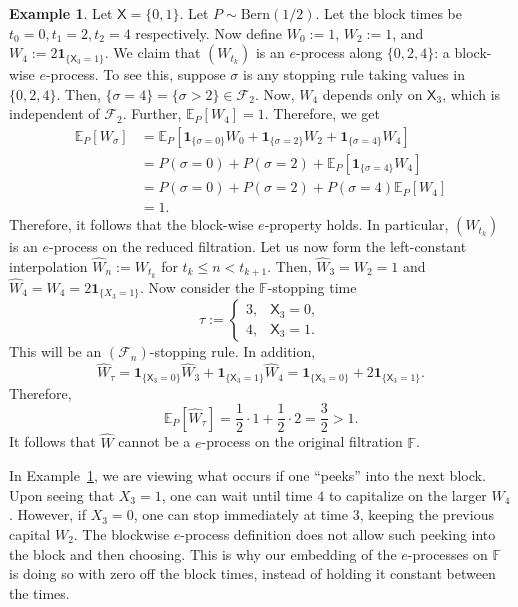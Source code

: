 \documentclass[11pt]{article}
\newcommand{\E}{\mathbb{E}}
\newcommand{\X}{\mathsf{X}}
\newcommand{\bbF}{\mathbb F}
\theoremstyle{definition}
\newtheorem{example}[theorem]{Example}
\theoremstyle{definition}
\begin{document}
\begin{example}\label{ex:counterzero-versus-constant-eproc}
Let $\X=\{0,1\}$. Let $P\sim\mathrm{Bern}(1/2)$. Let the block times be $t_0=0, t_1=2, t_2=4$ respectively. Now define $W_0:=1$, $W_2:=1$, and $W_4:=2\mathbf{1}_{\{\X_{3}=1\}}$. We claim that $(W_{t_k})$ is an $e$-process along $\{0,2,4\}$: a block-wise $e$-process. To see this, suppose $\sigma$ is any stopping rule taking values in $\{0,2,4\}$. Then, $\{\sigma=4\}=\{\sigma>2\}\in\mathcal F_2$. Now, $W_4$ depends only on $\X_3$, which is independent of $\mathcal F_2$. Further, $\E_P[W_4]=1$. Therefore, we get
\begin{align*}
\E_P[W_{\sigma}]&=\E_P[\mathbf{1}_{\{\sigma=0\}}W_0+\mathbf{1}_{\{\sigma=2\}}W_2+\mathbf{1}_{\{\sigma=4\}}W_4]\\
&= P(\sigma=0) + P(\sigma=2) + \E_P[\mathbf{1}_{\{\sigma=4\}}W_4]\\
&= P(\sigma=0)+P(\sigma=2)+P(\sigma=4)\E_P[W_4]\\
&= 1.
\end{align*}
Therefore, it follows that the block-wise $e$-property holds. In particular, $(W_{t_k})$ is an $e$-process on the reduced filtration. Let us now form the left-constant interpolation $\widehat W_n:=W_{t_k}$ for $t_k\le n<t_{k+1}$. Then, $\widehat W_3=W_2=1$ and $\widehat W_4=W_4=2\mathbf{1}_{\{X_3=1\}}$. Now consider the $\bbF$-stopping time
\[
\tau:=
\begin{cases}
3,&\X_3=0,\\
4,&\X_3=1.
\end{cases}
\]
This will be an $(\mathcal F_n)$-stopping rule. In addition,
\[
\widehat W_{\tau}=\mathbf{1}_{\{\X_3=0\}}\widehat W_3 + \mathbf{1}_{\{\X_3=1\}}\widehat W_4 = \mathbf{1}_{\{\X_3=0\}} + 2\mathbf{1}_{\{\X_3=1\}}.
\]
Therefore,
\[
\E_P[\widehat W_{\tau}]=\frac12 \cdot 1 + \frac12 \cdot 2 = \frac32 > 1.
\]
It follows that $\widehat W$ cannot be a $e$-process on the original filtration $\bbF$.
\end{example}
In Example~\ref{ex:counterzero-versus-constant-eproc}, we are viewing what occurs if one ``peeks'' into the next block. Upon seeing that $X_3=1$, one can wait until time $4$ to capitalize on the larger $W_4$. However, if $X_3=0$, one can stop immediately at time $3$, keeping the previous capital $W_2$. The blockwise $e$-process definition does not allow such peeking into the block and then choosing. This is why our embedding of the $e$-processes on $\bbF$ is doing so with zero off the block times, instead of holding it constant between the times. 
\end{document}
